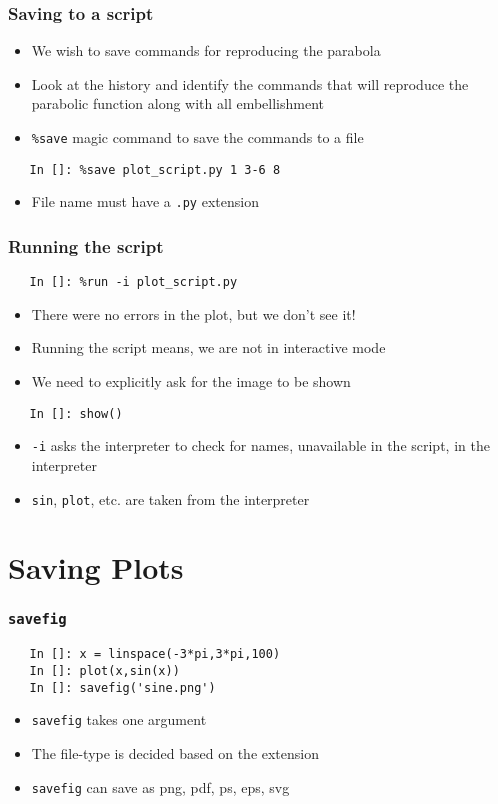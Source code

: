 \begin{frame}[fragile]
  \frametitle{Saving to a script}
  \begin{itemize}
  \item We wish to save commands for reproducing the parabola
  \item Look at the history and identify the commands that will
    reproduce the parabolic function along with all embellishment
  \item \texttt{\%save} magic command to save the commands to a file
  \end{itemize}
  \begin{lstlisting}
   In []: %save plot_script.py 1 3-6 8
  \end{lstlisting}
  \begin{itemize}
  \item File name must have a \texttt{.py} extension
  \end{itemize}
\end{frame}

\begin{frame}[fragile]
  \frametitle{Running the script}
  \begin{lstlisting}
   In []: %run -i plot_script.py
  \end{lstlisting}
  \begin{itemize}
  \item There were no errors in the plot, but we don't see it!
  \item Running the script means, we are not in interactive mode
  \item We need to explicitly ask for the image to be shown
  \end{itemize}
  \begin{lstlisting}
   In []: show()
  \end{lstlisting}
  \begin{itemize}
  \item \texttt{-i} asks the interpreter to check for names,
    unavailable in the script, in the interpreter
  \item \texttt{sin}, \texttt{plot}, etc. are taken from the
    interpreter
  \end{itemize}
\end{frame}

\section{Saving Plots}

\begin{frame}[fragile]
  \frametitle{\texttt{savefig}}
  \begin{lstlisting}
   In []: x = linspace(-3*pi,3*pi,100)
   In []: plot(x,sin(x))
   In []: savefig('sine.png')
  \end{lstlisting}
  \begin{itemize}
  \item \texttt{savefig} takes one argument
  \item The file-type is decided based on the extension
  \item \texttt{savefig} can save as png, pdf, ps, eps, svg
  \end{itemize}
\end{frame}

